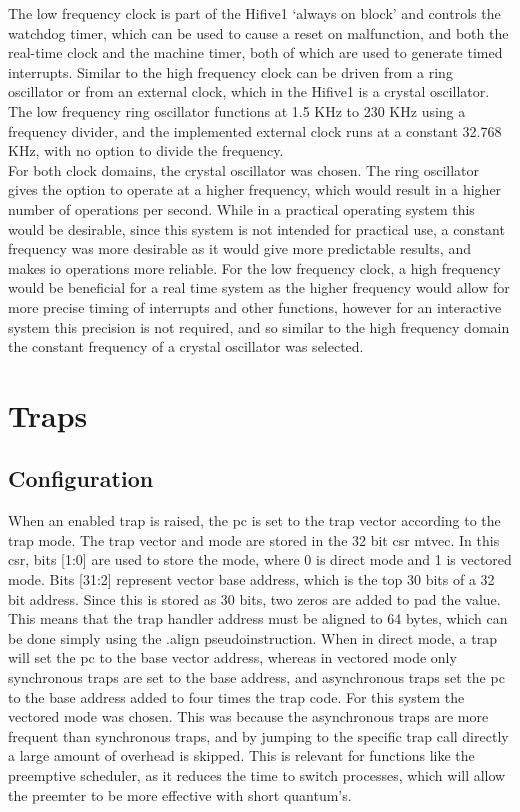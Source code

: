 The low frequency clock is part of the Hifive1 `always on block' and controls the watchdog timer, which can be used to cause a reset on malfunction, and both the real-time clock and the machine timer, both of which are used to generate timed interrupts. Similar to the high frequency clock can be driven from a ring oscillator or from an external clock, which in the Hifive1 is a crystal oscillator. The low frequency ring oscillator functions at 1.5 KHz to 230 KHz using a frequency divider, and the implemented external clock runs at a constant 32.768 KHz, with no option to divide the frequency.
\\
For both clock domains, the crystal oscillator was chosen. The ring oscillator gives the option to operate at a higher frequency, which would result in a higher number of operations per second. While in a practical operating system this would be desirable, since this system is not intended for practical use, a constant frequency was more desirable as it would give more predictable results, and makes \ac{io} operations more reliable. For the low frequency clock, a high frequency would be beneficial for a real time system as the higher frequency would allow for more precise timing of interrupts and other functions, however for an interactive system this precision is not required, and so similar to the high frequency domain the constant frequency of a crystal oscillator was selected.
\section{Traps}
\subsection{Configuration}
When an enabled trap is raised, the pc is set to the trap vector according to the trap mode. The trap vector and mode are stored in the 32 bit csr mtvec. In this csr, bits [1:0] are used to store the mode, where 0 is direct mode and 1 is vectored mode. Bits [31:2] represent vector base address, which is the top 30 bits of a 32 bit address. Since this is stored as 30 bits, two zeros are added to pad the value. This means that the trap handler address must be aligned to 64 bytes, which can be done simply using the .align pseudoinstruction. When in direct mode, a trap will set the pc to the base vector address, whereas in vectored mode only synchronous traps are set to the base address, and asynchronous traps set the pc to the base address added to four times the trap code. For this system the vectored mode was chosen. This was because the asynchronous traps are more frequent than synchronous traps, and by jumping to the specific trap call directly a large amount of overhead is skipped. This is relevant for functions like the preemptive scheduler, as it reduces the time to switch processes, which will allow the preemter to be more effective with short quantum's.
